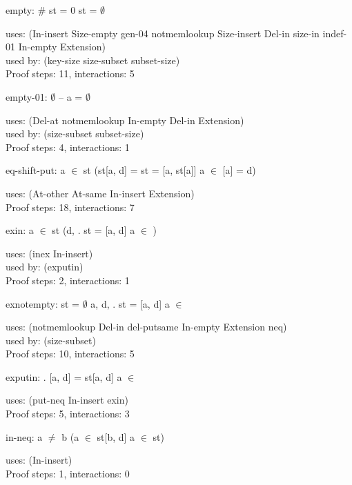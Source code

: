 \documentclass[a4paper]{article}
\begin{document}
\medskip

empty: 
 \Fol \# st = 0 \Equiv st = $\emptyset$


uses: (In-insert Size-empty gen-04 notmemlookup Size-insert Del-in
       size-in indef-01 In-empty Extension)\\
used by: (key-size size-subset subset-size)\\
Proof steps: 11, interactions: 5

\medskip

empty-01: 
 \Fol $\emptyset$ -- a = $\emptyset$


uses: (Del-at notmemlookup In-empty Del-in Extension)\\
used by: (size-subset subset-size)\\
Proof steps: 4, interactions: 1

\medskip

eq-shift-put: 
 \Fol a $\in$ st \Imp (st[a, d] =  \Equiv st = [a, st[a]] \And a $\in$  \And {}[a] = d)


uses: (At-other At-same In-insert Extension)\\
Proof steps: 18, interactions: 7

\medskip

exin: 
 \Fol a $\in$ st \Equiv (\Ex d, . st = [a, d] \And \Not a $\in$ )


uses: (inex In-insert)\\
used by: (exputin)\\
Proof steps: 2, interactions: 1

\medskip

exnotempty: 
 \Fol st = $\emptyset$ \Equiv \Not \Ex a, d, . st = [a, d] \And \Not a $\in$ 


uses: (notmemlookup Del-in del-putsame In-empty Extension neq)\\
used by: (size-subset)\\
Proof steps: 10, interactions: 5

\medskip

exputin: 
 \Fol \Ex {}. [a, d] = st[a, d] \And \Not a $\in$ 


uses: (put-neq In-insert exin)\\
Proof steps: 5, interactions: 3

\medskip

in-neq: 
 \Fol a $\neq$ b \Imp (a $\in$ st[b, d] \Equiv a $\in$ st)


uses: (In-insert)\\
Proof steps: 1, interactions: 0
\end{document}
